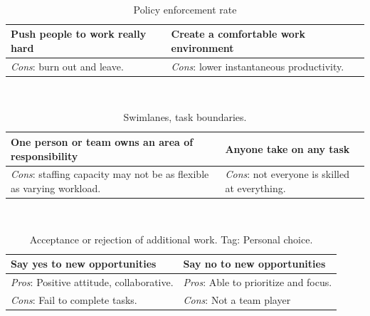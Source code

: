 \ \\

\begin{center}
\begin{table}[ht]
\begin{tabular}{ | m{\dilemmatablewidth}| m{\dilemmatablewidth} | } 
  \hline
  \textbf{Push people to work really hard} & 
  \textbf{Create a comfortable work environment} \\ 
  \hline
  \textit{Cons}: burn out and leave. & 
  \textit{Cons}: lower instantaneous productivity. \\  
  \hline
\end{tabular}
\caption{Policy enforcement rate
}
\end{table}
\end{center}

\ \\

\begin{center}
\begin{table}[ht]
\begin{tabular}{ | m{\dilemmatablewidth}| m{\dilemmatablewidth} | } 
  \hline
  \textbf{One person or team owns an area of responsibility} & 
  \textbf{Anyone take on any task} \\ 
  \hline
  \textit{Cons}: staffing capacity may not be as flexible as varying workload. & 
  \textit{Cons}: not everyone is skilled at everything. \\  
  \hline
\end{tabular}
\caption{Swimlanes, task boundaries.
}
\end{table}
\end{center}

\ \\

\begin{center}
\begin{table}[ht]
\begin{tabular}{ | m{\dilemmatablewidth}| m{\dilemmatablewidth} | } 
  \hline
  \textbf{Say yes to new opportunities} & 
  \textbf{Say no to new opportunities} \\ 
  \hline
  \textit{Pros}: Positive attitude, collaborative. &
  \textit{Pros}: Able to prioritize and focus. \\
  \hline
  \textit{Cons}: Fail to complete tasks. &
  \textit{Cons}: Not a team player \\  
  \hline
\end{tabular}
\caption{Acceptance or rejection of additional work.
{\tiny Tag: Personal choice.}
}
\end{table}
\end{center}

